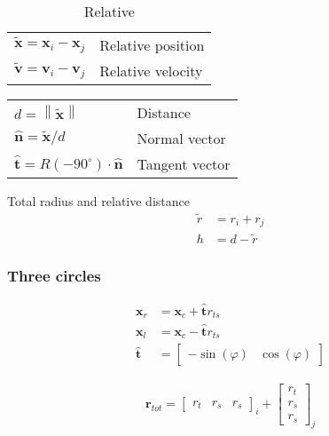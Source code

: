 \begin{table}[H]
\begin{tabularx}{1.0\linewidth}{ll}
\hline
\hline
$ \tilde{\mathbf{x}} = \mathbf{x}_{i} - \mathbf{x}_{j} $ & Relative position \\
$ \tilde{\mathbf{v}} = \mathbf{v}_{i} - \mathbf{v}_{j} $ & Relative velocity \\
\hline
\hline
\end{tabularx}
\caption{Relative}
\end{table}

\begin{table}[H]
\begin{tabularx}{1.0\linewidth}{ll}
\hline
\hline
$ d = \left\|\tilde{\mathbf{x}}\right\| $ & Distance\\
$ \hat{\mathbf{n}} = \tilde{\mathbf{x}} / d $ & Normal vector \\
$ \hat{\mathbf{t}} = R(-90^{\circ}) \cdot \hat{\mathbf{n}} $ & Tangent vector \\
\hline
\hline
\end{tabularx}
\end{table}

Total radius and relative distance
\begin{align}
\tilde{r} &= r_{i} + r_{j} \\
h &= d - \tilde{r}
\end{align}


\subsubsection{Three circles}

\begin{align}
\mathbf{x}_{r} &= \mathbf{x}_{c} + \hat{\mathbf{t}} r_{ts}  \\
\mathbf{x}_{l} &= \mathbf{x}_{c} - \hat{\mathbf{t}} r_{ts} \\
\hat{\mathbf{t}} &= \begin{bmatrix} -\sin(\varphi) & \cos(\varphi) \end{bmatrix}
\end{align}

\begin{align}
\mathbf{r}_{tot} = \begin{bmatrix} r_{t} & r_{s} & r_{s} \end{bmatrix}_{i} + \begin{bmatrix} r_{t} \\ r_{s} \\ r_{s} \end{bmatrix}_{j}
\end{align}

